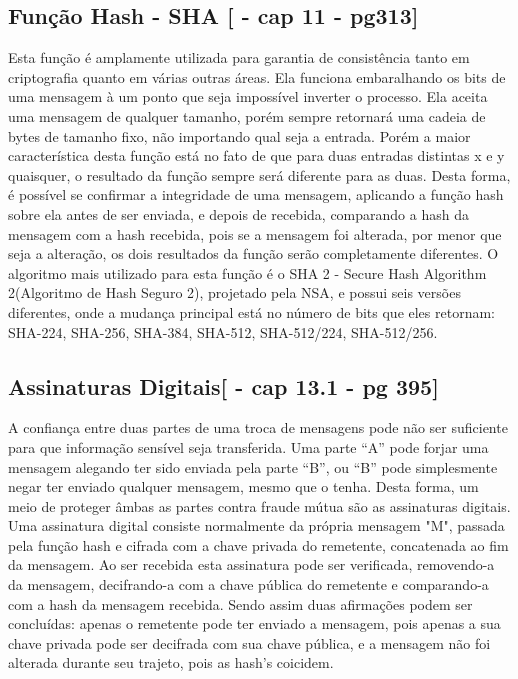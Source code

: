 \documentclass{article}
\begin{document}
		\subsection{Função Hash - SHA [\cite{STALLINS} - cap 11 - pg313]}
			\begin{justify}
			

				\hspace{2cm} Esta função é amplamente utilizada para garantia de consistência tanto em criptografia quanto em várias outras áreas. Ela funciona embaralhando os bits de uma mensagem à um ponto que seja impossível inverter o processo. Ela aceita uma mensagem de qualquer tamanho, porém sempre retornará uma cadeia de bytes de tamanho fixo, não importando qual seja a entrada. Porém a maior característica desta função está no fato de que para duas entradas distintas x e y quaisquer, o resultado da função sempre será diferente para as duas. Desta forma, é possível se confirmar a integridade de uma mensagem, aplicando a função hash sobre ela antes de ser enviada, e depois de recebida, comparando a hash da mensagem com a hash recebida, pois se a mensagem foi alterada, por menor que seja a alteração, os dois resultados da função serão completamente diferentes. O algoritmo mais utilizado para esta função é o SHA 2 - Secure Hash Algorithm 2(Algoritmo de Hash Seguro 2), projetado pela NSA, e possui seis versões diferentes, onde a mudança principal está no número de bits que eles retornam: SHA-224, SHA-256, SHA-384, SHA-512, SHA-512/224, SHA-512/256. 
			
			\end{justify}

		\subsection{Assinaturas Digitais[\cite{STALLINS} - cap 13.1 - pg 395]}
			\begin{justify}
			

				\hspace{2cm}A confiança entre duas partes de uma troca de mensagens pode não ser suficiente para que informação sensível seja transferida. Uma parte “A” pode forjar uma mensagem alegando ter sido enviada pela parte “B”, ou “B” pode simplesmente negar ter enviado qualquer mensagem, mesmo que o tenha. Desta forma, um meio de proteger âmbas as partes contra fraude mútua são as assinaturas digitais.
		Uma assinatura digital consiste normalmente da própria mensagem "M", passada pela função hash e cifrada com a chave privada do remetente, concatenada ao fim da mensagem. Ao ser recebida esta assinatura pode ser verificada, removendo-a da mensagem, decifrando-a com a chave pública do remetente e comparando-a com a hash da mensagem recebida. Sendo assim duas afirmações podem ser concluídas: apenas o remetente pode ter enviado a mensagem, pois apenas a sua chave privada pode ser decifrada com sua chave pública, e a mensagem não foi alterada durante seu trajeto, pois as hash's coicidem.
			
			
			\end{justify}
\end{document}
